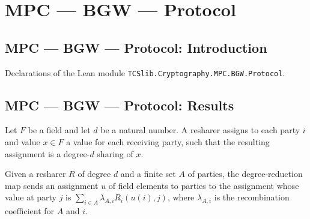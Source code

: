 \section{MPC --- BGW --- Protocol}
\subsection*{MPC --- BGW --- Protocol: Introduction}

Declarations of the Lean module \texttt{TCSlib.Cryptography.MPC.BGW.Protocol}.

\subsection*{MPC --- BGW --- Protocol: Results}

\begin{definition}
\label{TCSlib.MPC.BGW.Resharer}
\leanok
{}
Let $F$ be a field and let $d$ be a natural number. A resharer assigns to each party $i$
and value $x \in F$ a value for each receiving party, such that the resulting assignment
is a degree-$d$ sharing of $x$.
\end{definition}

\begin{definition}
\label{TCSlib.MPC.BGW.degreeReduce}
\leanok
{}
Given a resharer $R$ of degree $d$ and a finite set $A$ of parties, the degree-reduction
map sends an assignment $u$ of field elements to parties to the assignment whose value
at party $j$ is $\sum_{i\in A} \lambda_{A,i} R_i(u(i),j)$, where $\lambda_{A,i}$ is the
recombination coefficient for $A$ and $i$.
\end{definition}

